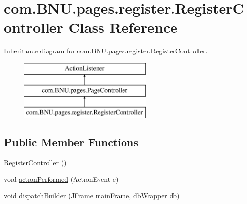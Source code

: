 \hypertarget{classcom_1_1_b_n_u_1_1pages_1_1register_1_1_register_controller}{}\section{com.\+B\+N\+U.\+pages.\+register.\+Register\+Controller Class Reference}
\label{classcom_1_1_b_n_u_1_1pages_1_1register_1_1_register_controller}
Inheritance diagram for com.\+B\+N\+U.\+pages.\+register.\+Register\+Controller\+:\begin{figure}[H]
\begin{center}
\leavevmode
\includegraphics[height=3.000000cm]{classcom_1_1_b_n_u_1_1pages_1_1register_1_1_register_controller}
\end{center}
\end{figure}
\subsection*{Public Member Functions}
\begin{DoxyCompactItemize}
\item 
\mbox{\hyperlink{classcom_1_1_b_n_u_1_1pages_1_1register_1_1_register_controller_a45ea6a2f88a5efa768b71dd4855fa235}{Register\+Controller}} ()
\item 
void \mbox{\hyperlink{classcom_1_1_b_n_u_1_1pages_1_1register_1_1_register_controller_a14986f6f139a8b1329af3f0a4fb9e4bb}{action\+Performed}} (Action\+Event e)
\item 
void \mbox{\hyperlink{classcom_1_1_b_n_u_1_1pages_1_1register_1_1_register_controller_a86983166865542e443af0eddfd5c434c}{dispatch\+Builder}} (J\+Frame main\+Frame, \mbox{\hyperlink{interfacecom_1_1_b_n_u_1_1database_1_1db_wrapper}{db\+Wrapper}} db)
\end{DoxyCompactItemize}
